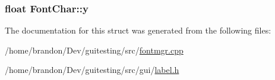 \hypertarget{struct_font_char_380d101cfe1d31e8a47034b2dbf12dbf}{
\subsubsection[{y}]{\setlength{\rightskip}{0pt plus 5cm}float {\bf FontChar::y}}}
\label{struct_font_char_380d101cfe1d31e8a47034b2dbf12dbf}




The documentation for this struct was generated from the following files:\begin{CompactItemize}
\item 
/home/brandon/Dev/guitesting/src/\hyperlink{fontmgr_8cpp}{fontmgr.cpp}\item 
/home/brandon/Dev/guitesting/src/gui/\hyperlink{label_8h}{label.h}\end{CompactItemize}
